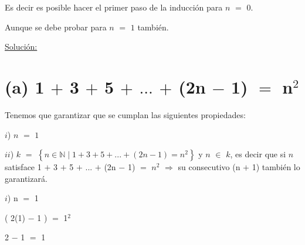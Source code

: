 \documentclass[12pt]{article}
\newenvironment{MyColorPar}[1]{%
    \leavevmode\color{#1}\ignorespaces%
}{%
}%
\begin{document}
\vspace{0.3cm}

\begin{MyColorPar}{Tahiti Gold}

Es decir es posible hacer el primer paso de la inducción para $n$ $=$ $0$. 

Aunque se debe probar para $n$ $=$ $1$ también. 

\end{MyColorPar} \vspace{0.5cm}

{\textcolor{Terracotta}{\underline {Solución:}}}
\section*{(a) 1 $+$ 3 $+$ 5 $+$ $...$ $+$ (2n $-$ 1) $=$ n$^{2}$ } 

 \begin{MyColorPar}{Boston Blue}
 
 Tenemos que garantizar que se cumplan las siguientes propiedades: 
 
\end{MyColorPar} \vspace{0.2cm}

 \begin{MyColorPar}{verde_manzana}
 $i$) $n$ $=$ $1$
 
 $ii$) $k$ $=$ $\left\{n \in \mathbb{N} \mid 1 + 3 + 5 + ... + (2n - 1) = n^{2} \right\}$ y $n$ $\in$ $k$, es decir que si $n$ satisface 1 $+$ 3 $+$ 5 $+$ $...$ $+$ (2n $-$ 1) $=$ $n$$^{2}$ \hspace{0.2cm} $\Longrightarrow$ \hspace{0.2cm} su consecutivo (n $+$ 1) también lo garantizará.
 \end{MyColorPar} \vspace{0.2cm}
 
{\textcolor{verde_manzana}{$i$)  n $=$ 1}}
 
\hspace{4cm} ( 2(1) $-$ 1 ) $=$ 1$^{2}$ \vspace{0.2cm}

\hspace{5.3cm}  2 $-$ 1 $=$ 1 \vspace{0.2cm}
\end{document}
